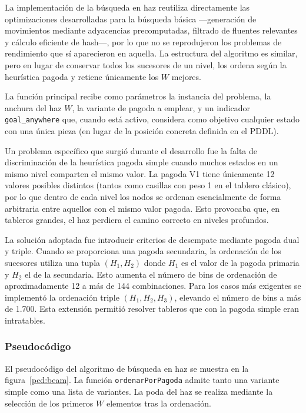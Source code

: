 \documentclass[conference,a4paper]{IEEEtran}
\begin{document}
La implementación de la búsqueda en haz reutiliza directamente las
optimizaciones desarrolladas para la búsqueda básica —generación de
movimientos mediante adyacencias precomputadas, filtrado de fluentes
relevantes y cálculo eficiente de hash—, por lo que no se reprodujeron los
problemas de rendimiento que sí aparecieron en aquella. La estructura del
algoritmo es similar, pero en lugar de conservar todos los sucesores de un
nivel, los ordena según la heurística pagoda y retiene únicamente los $W$
mejores.

La función principal recibe como parámetros la instancia del problema, la
anchura del haz $W$, la variante de pagoda a emplear, y un indicador
\texttt{goal\_anywhere} que, cuando está activo, considera como objetivo
cualquier estado con una única pieza (en lugar de la posición concreta
definida en el PDDL).

Un problema específico que surgió durante el desarrollo fue la falta de
discriminación de la heurística pagoda simple cuando muchos estados en un mismo
nivel comparten el mismo valor. La pagoda V1 tiene únicamente 12 valores
posibles distintos (tantos como casillas con peso 1 en el tablero clásico), por
lo que dentro de cada nivel los nodos se ordenan esencialmente de forma
arbitraria entre aquellos con el mismo valor pagoda. Esto provocaba que, en
tableros grandes, el haz perdiera el camino correcto en niveles profundos.

La solución adoptada fue introducir criterios de desempate mediante pagoda
dual y triple. Cuando se proporciona una pagoda secundaria, la ordenación de
los sucesores utiliza una tupla $(H_1, H_2)$ donde $H_1$ es el valor de la
pagoda primaria y $H_2$ el de la secundaria. Esto aumenta el número de bins
de ordenación de aproximadamente 12 a más de 144 combinaciones. Para los
casos más exigentes se implementó la ordenación triple $(H_1, H_2, H_3)$,
elevando el número de bins a más de 1.700. Esta extensión permitió resolver
tableros que con la pagoda simple eran intratables.

\subsubsection{Pseudocódigo}

El pseudocódigo del algoritmo de búsqueda en haz se muestra en la
figura~\ref{pcd:beam}. La función \texttt{ordenarPorPagoda} admite tanto una
variante simple como una lista de variantes. La poda del haz se realiza
mediante la selección de los primeros $W$ elementos tras la ordenación.
\end{document}
